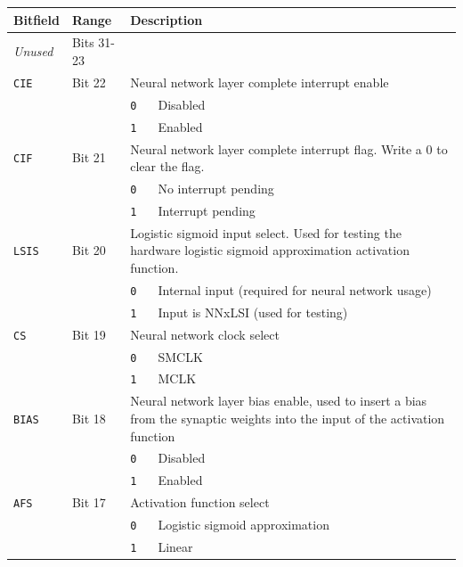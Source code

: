 \begin{tabularx}{\textwidth}{ l l l X }
\textbf{Bitfield} & \textbf{Range} & \multicolumn{2}{X}{\textbf{Description}} \\ \hline
\textit{Unused} & Bits 31-23 & \multicolumn{2}{X}{} \\
\hline
\texttt{CIE} & Bit 22 & \multicolumn{2}{X}{Neural network layer complete interrupt enable} \\
 & & \texttt{0} & Disabled \\
 & & \cellcolor{tablehighlightcolor}\texttt{1} & \cellcolor{tablehighlightcolor}Enabled \\
\hline
\texttt{CIF} & Bit 21 & \multicolumn{2}{X}{Neural network layer complete interrupt flag. Write a 0 to clear the flag.} \\
 & & \texttt{0} & No interrupt pending \\
 & & \cellcolor{tablehighlightcolor}\texttt{1} & \cellcolor{tablehighlightcolor}Interrupt pending \\
\hline
\texttt{LSIS} & Bit 20 & \multicolumn{2}{X}{Logistic sigmoid input select. Used for testing the hardware logistic sigmoid approximation activation function.} \\
 & & \texttt{0} & Internal input (required for neural network usage) \\
 & & \cellcolor{tablehighlightcolor}\texttt{1} & \cellcolor{tablehighlightcolor}Input is NNxLSI (used for testing) \\
\hline
\texttt{CS} & Bit 19 & \multicolumn{2}{X}{Neural network clock select} \\
 & & \texttt{0} & SMCLK \\
 & & \cellcolor{tablehighlightcolor}\texttt{1} & \cellcolor{tablehighlightcolor}MCLK \\
\hline
\texttt{BIAS} & Bit 18 & \multicolumn{2}{X}{Neural network layer bias enable, used to insert a bias from the synaptic weights into the input of the activation function} \\
 & & \texttt{0} & Disabled \\
 & & \cellcolor{tablehighlightcolor}\texttt{1} & \cellcolor{tablehighlightcolor}Enabled \\
\hline
\texttt{AFS} & Bit 17 & \multicolumn{2}{X}{Activation function select} \\
 & & \texttt{0} & Logistic sigmoid approximation \\
 & & \cellcolor{tablehighlightcolor}\texttt{1} & \cellcolor{tablehighlightcolor}Linear \\
\hline

\end{tabularx}
